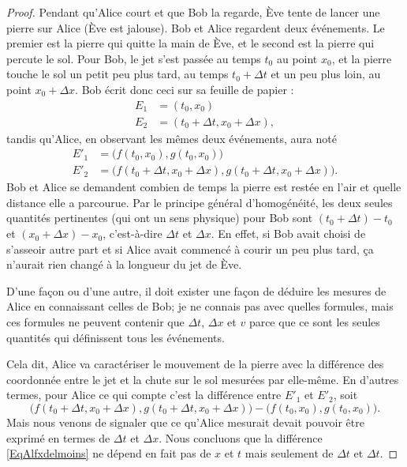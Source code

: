 \begin{proof}
	Pendant qu'Alice court et que Bob la regarde, Ève tente de lancer une pierre sur Alice (Ève est jalouse). Bob et Alice regardent deux événements. Le premier est la pierre qui quitte la main de Ève, et le second est la pierre qui percute le sol. Pour Bob, le jet s'est passée au temps \( t_0\) au point \( x_0\), et la pierre touche le sol un petit peu plus tard, au temps \( t_0+\Delta t\) et un peu plus loin, au point \( x_0+\Delta x\). Bob écrit donc ceci sur sa feuille de papier :
	\[
		\begin{split}
			E_1&=(t_0,x_0)\\
			E_2&=(t_0+\Delta t,x_0+\Delta x),
		\end{split}
	\]
	tandis qu'Alice, en observant les mêmes deux événements, aura noté
	\[
		\begin{split}
			E'_1&=\big( f(t_0,x_0),g(t_0,x_0) \big) \\
			E'_2&=\big( f(t_0+\Delta t,x_0+\Delta x), g(t_0+\Delta t,x_0+\Delta x) \big).
		\end{split}
	\]
	Bob et Alice se demandent combien de temps la pierre est restée en l'air et quelle distance elle a parcourue. Par le principe général d'homogénéité, les deux seules quantités pertinentes (qui ont un sens physique) pour Bob sont \( (t_0+\Delta t)-t_0\) et \( (x_0+\Delta x)-x_0\), c'est-à-dire \( \Delta t\) et \( \Delta x\). En effet, si Bob avait choisi de s'asseoir autre part et si Alice avait commencé à courir un peu plus tard, ça n'aurait rien changé à la longueur du jet de Ève.

	D'une façon ou d'une autre, il doit exister une façon de déduire les mesures de Alice en connaissant celles de Bob; je ne connais pas avec quelles formules, mais ces formules ne peuvent contenir que \( \Delta t\), \( \Delta x\) et \( v\) parce que ce sont les seules quantités qui définissent tous les événements.

	Cela dit, Alice va caractériser le mouvement de la pierre avec la différence des coordonnée entre le jet et la chute sur le sol mesurées par elle-même. En d'autres termes, pour Alice ce qui compte c'est la différence entre \( E'_1\) et \( E'_2\), soit
	\begin{equation}	\label{EqAlfxdelmoins}
		\big( f(t_0+\Delta t,x_0+\Delta x), g(t_0+\Delta t,x_0+\Delta x) \big)-\big( f(t_0,x_0),g(t_0,x_0) \big).
	\end{equation}
	Mais nous venons de signaler que ce qu'Alice mesurait devait pouvoir être exprimé en termes de \( \Delta t\) et \( \Delta x\). Nous concluons que la différence \eqref{EqAlfxdelmoins} ne dépend en fait pas de \( x\) et \( t\) mais seulement de \( \Delta t\) et \( \Delta t\).


\end{proof}
